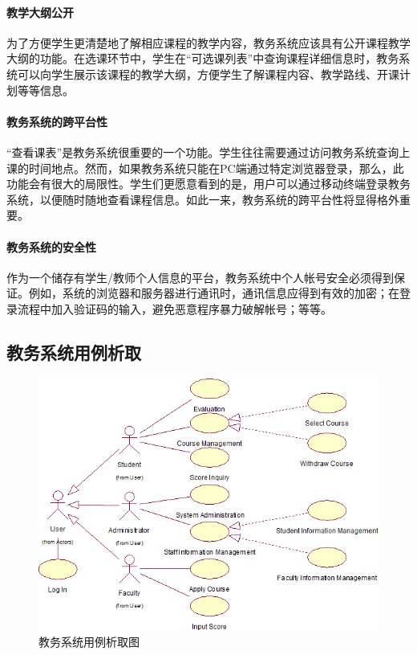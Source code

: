 \paragraph{教学大纲公开}

为了方便学生更清楚地了解相应课程的教学内容，教务系统应该具有公开课程教学大纲的功能。在选课环节中，学生在“可选课列表”中查询课程详细信息时，教务系统可以向学生展示该课程的教学大纲，方便学生了解课程内容、教学路线、开课计划等等信息。
    
\paragraph{教务系统的跨平台性}
    
“查看课表”是教务系统很重要的一个功能。学生往往需要通过访问教务系统查询上课的时间地点。然而，如果教务系统只能在PC端通过特定浏览器登录，那么，此功能会有很大的局限性。学生们更愿意看到的是，用户可以通过移动终端登录教务系统，以便随时随地查看课程信息。如此一来，教务系统的跨平台性将显得格外重要。
    
\paragraph{教务系统的安全性}
    
作为一个储存有学生/教师个人信息的平台，教务系统中个人帐号安全必须得到保证。例如，系统的浏览器和服务器进行通讯时，通讯信息应得到有效的加密；在登录流程中加入验证码的输入，避免恶意程序暴力破解帐号；等等。

\subsection{教务系统用例析取}
\begin{figure}[H]
   \centering \includegraphics[width=\textwidth]{img/jwxt_usecases.png}
   \caption{教务系统用例析取图}
\end{figure}

